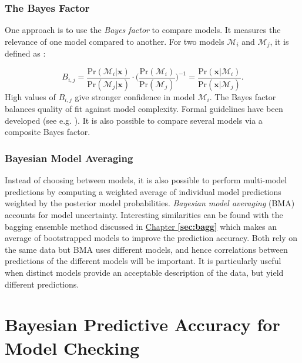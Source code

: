 \subsubsection*{The Bayes Factor}

One approach is to use the \emph{Bayes factor}
to compare models. It measures the relevance of one model compared to another. For two models $\mathcal{M}_i$ and $\mathcal{M}_j$, it is defined as : 

\begin{equation}
B_{i,j}=\frac{\text{Pr}(\mathcal{M}_i|\boldsymbol{x})}{\text{Pr}(\mathcal{M}_j|\boldsymbol{x})}\cdot \Bigg(\frac{\text{Pr}(\mathcal{M}_i)}{\text{Pr}(\mathcal{M}_j)}\Bigg)^{-1}= \frac{\text{Pr}(\boldsymbol{x}|\mathcal{M}_i)}{\text{Pr}(\boldsymbol{x}|\mathcal{M}_j)}.
\end{equation}
High values of $B_{i,j}$ give stronger confidence in model $\mathcal{M}_i$. The Bayes factor balances quality of fit against model complexity. Formal guidelines have been developed (see e.g. \citet{robert_1995}). It is also possible to compare several models via a composite Bayes factor.


\subsubsection*{Bayesian Model Averaging}

Instead of choosing between models, it is also possible to perform multi-model predictions by computing a weighted average of individual model predictions weighted by the posterior model probabilities. 
\emph{Bayesian model averaging} (BMA) accounts for model uncertainty. Interesting similarities can be found with the bagging ensemble method discussed in \hyperref[sec:bagg]{Chapter \textbf{\ref{sec:bagg}}} which makes an average of bootstrapped models to improve the prediction accuracy. Both rely on the same data but BMA uses different models, and hence correlations between predictions of the different models will be important. It is particularly useful when distinct models provide an acceptable description of the data, but yield different predictions.



\section{Bayesian Predictive Accuracy for Model Checking}\label{sec:predacur}



